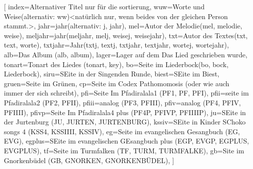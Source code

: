 [
	index={Alternativer Titel nur für die sortierung},
	wuw={Worte und Weise(alternativ: ww)<natürlich nur, wenn beides von der gleichen Person stammt.>},
	jahr={jahr(alternativ: j, jahr)},
	mel={Autor der Melodie(mel, melodie, weise)},
	meljahr={jahr(meljahr, melj, weisej, weisejahr)},
	txt={Autor des Textes(txt, text, worte)},
	txtjahr={Jahr(txtj, textj, txtjahr, textjahr, wortej, wortejahr)},
	alb={Das Album (alb, album)},
	lager={Lager auf dem Das Lied geschrieben wurde},
	tonart={Tonart des Liedes (tonart, key)},
	bo={Seite im Liederbock(bo, bock, Liederbock)},
	siru={SEite in der Singenden Runde},
	biest={SEite im Biest},
	gruen={Seite im Grünen},
	cp={Seite im Codex Pathomomosis (oder wie auch immer der sich schreibt)},
	pfi={Seite Im Pfadiralala1 (PF1, PF, PFI)},
	pfii={seite im Pfadiralala2 (PF2, PFII)},
	pfiii={analog (PF3, PFIII)},
	pfiv={analog (PF4, PFIV, PFIIII)},
	pfivp={Seite Im Pfadiralala4 plus (PF4P, PFIVP, PFIIIIP)},
	ju={SEite in der Jurtenburg (JU, JURTEN, JURTENBURG)},
	kssiv={SEite in Kinder SChoko songs 4 (KSS4, KSSIIII, KSSIV)},
	eg={Seite im evangelischen Gesangbuch (EG, EVG)},
	egplus={SEite im evangelischen GEsangbuch plus (EGP, EVGP, EGPLUS, EVGPLUS)},
	tf={Seite im Turmfalken (TF, TURM, TURMFALKE)},
	gb={Site im Gnorkenbüdel (GB, GNORKEN, GNORKENBÜDEL)},
]


